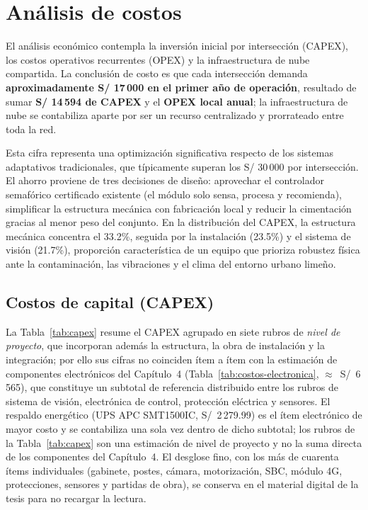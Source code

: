 \section{Análisis de costos}\label{cap:analisis-economico}

El análisis económico contempla la inversión inicial por intersección (CAPEX), los costos
operativos recurrentes (OPEX) y la infraestructura de nube compartida. La conclusión de costo
es que cada intersección demanda \textbf{aproximadamente S/ 17\,000 en el primer año de
operación}, resultado de sumar \textbf{S/ 14\,594 de CAPEX} y el \textbf{OPEX local anual}; la
infraestructura de nube se contabiliza aparte por ser un recurso centralizado y prorrateado
entre toda la red.

Esta cifra representa una optimización significativa respecto de los sistemas adaptativos
tradicionales, que típicamente superan los S/ 30\,000 por intersección. El ahorro proviene de
tres decisiones de diseño: aprovechar el controlador semafórico certificado existente (el
módulo solo sensa, procesa y recomienda), simplificar la estructura mecánica con fabricación
local y reducir la cimentación gracias al menor peso del conjunto. En la distribución del
CAPEX, la estructura mecánica concentra el 33.2\%, seguida por la instalación (23.5\%) y el
sistema de visión (21.7\%), proporción característica de un equipo que prioriza robustez física
ante la contaminación, las vibraciones y el clima del entorno urbano limeño.

\subsection{Costos de capital (CAPEX)}

La Tabla~\ref{tab:capex} resume el CAPEX agrupado en siete rubros de \emph{nivel de proyecto}, que
incorporan además la estructura, la obra de instalación y la integración; por ello sus cifras no
coinciden ítem a ítem con la estimación de componentes electrónicos del Capítulo~4
(Tabla~\ref{tab:costos-electronica}, $\approx$~S/~6\,565), que constituye un subtotal de referencia
distribuido entre los rubros de sistema de visión, electrónica de control, protección eléctrica y
sensores. El respaldo energético (UPS APC SMT1500IC, S/~2\,279.99) es el ítem electrónico de mayor costo y se
contabiliza una sola vez dentro de dicho subtotal; los rubros de la Tabla~\ref{tab:capex} son una estimación de
nivel de proyecto y no la suma directa de los componentes del Capítulo~4. El desglose
fino, con los más de cuarenta ítems individuales (gabinete, postes, cámara, motorización, SBC, módulo
4G, protecciones, sensores y partidas de obra), se conserva en el material digital de la tesis para no
recargar la lectura.

